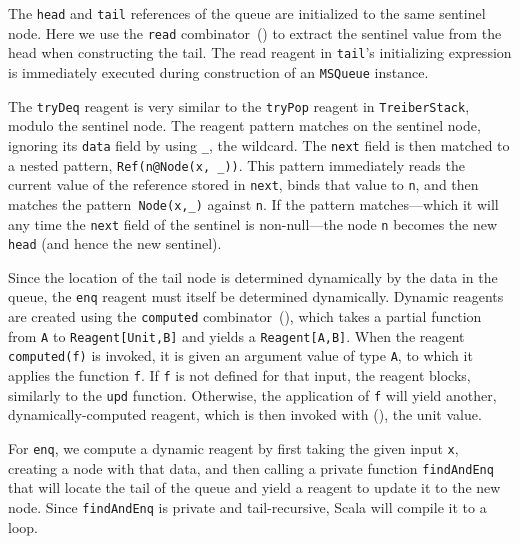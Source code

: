 \documentclass[preprint,nocopyrightspace]{sigplanconf}
\begin{document}
The \lstinline{head} and \lstinline{tail} references of the queue are
initialized to the same sentinel node.  Here we use the \lstinline{read}
combinator~() to extract the sentinel value from the head
when constructing the tail.  The read reagent in \lstinline{tail}'s initializing
expression is immediately executed during construction of an \lstinline{MSQueue}
instance.

The \lstinline{tryDeq} reagent is very similar to the \lstinline{tryPop}
reagent in \lstinline{TreiberStack}, modulo the sentinel node.  The reagent
pattern matches on the sentinel node, ignoring its \lstinline{data} field by
using \lstinline{_}, the wildcard.  The \lstinline{next} field is then matched
to a nested pattern, \lstinline{Ref(n@Node(x, _))}.  This pattern immediately
reads the current value of the reference stored in \lstinline{next}, binds
that value to \lstinline{n}, and then matches the
pattern~\lstinline{Node(x,_)} against \lstinline{n}.  If the pattern
matches---which it will any time the \lstinline{next} field of the sentinel is
non-null---the node \lstinline{n} becomes the new \lstinline{head} (and hence
the new sentinel).  

Since the location of the tail node is determined dynamically by the data in the
queue, the \lstinline{enq} reagent must itself be determined dynamically.
Dynamic reagents are created using the \lstinline{computed}
combinator~(), which takes a partial function from
\lstinline{A} to \lstinline{Reagent[Unit,B]} and yields a
\lstinline{Reagent[A,B]}.  When the reagent \lstinline{computed(f)} is invoked,
it is given an argument value of type \lstinline{A}, to which it applies the
function \lstinline{f}.  If \lstinline{f} is not defined for that input, the
reagent blocks, similarly to the \lstinline{upd} function.  Otherwise, the
application of \lstinline{f} will yield another, dynamically-computed reagent,
which is then invoked with (), the unit value.

For \lstinline{enq}, we compute a dynamic reagent by first taking the given
input \lstinline{x}, creating a node with that data, and then calling a private
function \lstinline{findAndEnq} that will locate the tail of the queue and yield
a reagent to update it to the new node.  Since \lstinline{findAndEnq} is
private and tail-recursive, Scala will compile it to a loop.
\end{document}
